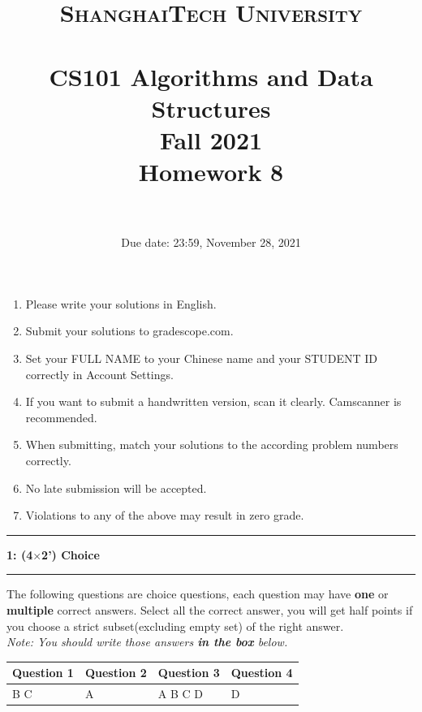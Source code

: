 \documentclass[10.5pt]{article}
\title{
	\normalfont \normalsize
	\textsc{ShanghaiTech University} \\ [25pt]
	\horrule{0.5pt} \\[0.4cm] %
	\huge CS101 Algorithms and Data Structures\\ %
	\LARGE Fall 2021\\
	\LARGE Homework 8\\
	\horrule{2pt} \\[0.5cm] %
}
\author{}
\date{Due date: 23:59, November 28, 2021}
\newcommand\question[2]{\vspace{.25in}\hrule\textbf{#1: #2}\vspace{.5em}\hrule\vspace{.10in}}
\begin{document}
\maketitle
\thispagestyle{firstpage}
\vspace{3ex}

\begin{enumerate}
	\item Please write your solutions in English.

	\item Submit your solutions to gradescope.com.

	\item Set your FULL NAME to your Chinese name and your STUDENT ID correctly in Account Settings.

	\item If you want to submit a handwritten version, scan it clearly. Camscanner is recommended.

	\item When submitting, match your solutions to the according problem numbers correctly.

	\item No late submission will be accepted.

	\item Violations to any of the above may result in zero grade.
\end{enumerate}
\newpage

\question{1}{(4$\times$2') Choice}
The following \textit{} questions are choice questions, each question may have \textbf{one} or \textbf{multiple} correct answers. Select all the correct answer, you will get half points if you choose a strict subset(excluding empty set) of the right answer.\\
\textit{Note: You should write those answers \textbf{in the box} below.}

\begin{table}[htbp]
	\begin{tabular}{|p{2cm}|p{2cm}|p{2cm}|p{2cm}|}
		\hline
		Question 1 & Question 2 & Question 3 & Question 4 \\
		\hline
		B C        & A          & A B C D    & D          \\
		\hline
	\end{tabular}
\end{table}
\end{document}
